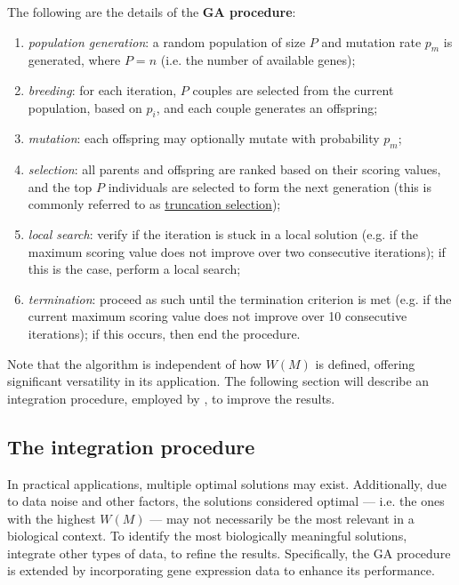 \begin{definition}[GA procedure]
    The following are the details of the \textbf{GA procedure}:

    \begin{enumerate}
        \item \textit{population generation}: a random population of size $P$ and mutation rate $p_m$ is generated, where $P = n$ (i.e. the number of available genes);
        \item \textit{breeding}: for each iteration, $P$ couples are selected from the current population, based on $p_i$, and each couple generates an offspring;
        \item \textit{mutation}: each offspring may optionally mutate with probability $p_m$;
        \item \textit{selection}: all parents and offspring are ranked based on their scoring values, and the top $P$ individuals are selected to form the next generation (this is commonly referred to as \href{https://en.wikipedia.org/wiki/Truncation_selection}{truncation selection});
        \item \textit{local search}: verify if the iteration is stuck in a local solution (e.g. if the maximum scoring value does not improve over two consecutive iterations); if this is the case, perform a local search;
        \item \textit{termination}: proceed as such until the termination criterion is met (e.g. if the current maximum scoring value does not improve over 10 consecutive iterations); if this occurs, then end the procedure.
    \end{enumerate}
\end{definition}

Note that the algorithm is independent of how $W(M)$ is defined, offering significant versatility in its application. The following section will describe an integration procedure, employed by \textcite{mdpfinder}, to improve the results.

\subsection{The integration procedure}

In practical applications, multiple optimal solutions may exist. Additionally, due to data noise and other factors, the solutions considered optimal --- i.e. the ones with the highest $W(M)$ --- may not necessarily be the most relevant in a biological context. To identify the most biologically meaningful solutions, \textcite{mdpfinder} integrate other types of data, to refine the results. Specifically, the GA procedure is extended by incorporating gene expression data to enhance its performance.

